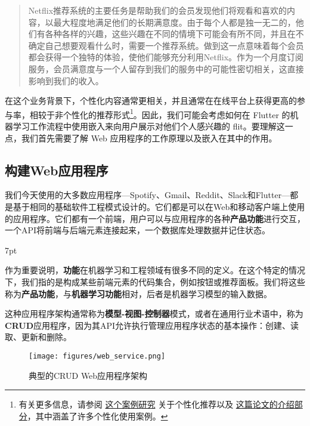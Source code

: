 \documentclass[Chinese, 11pt, table]{diazessay} %
\newenvironment{formal}{%
  \def\FrameCommand{%
	\hspace{1pt}%
	{\color{w_lightblue}\vrule width 2pt}%
	{\color{formalshade}\vrule width 4pt}%
	\colorbox{formalshade}%
  }%
  \MakeFramed{\advance\hsize-\width\FrameRestore}%
  \noindent\hspace{-4.55pt}%
  \begin{adjustwidth}{}{7pt}%
  \vspace{2pt}\vspace{2pt}%
}
{%
  \vspace{2pt}\end{adjustwidth}\endMakeFramed%
}
\begin{document}
\begin{CJK}{UTF8}{gbsn}
\begin{sloppypar}
\begin{quote}
Netflix推荐系统的主要任务是帮助我们的会员发现他们将观看和喜欢的内容，以最大程度地满足他们的长期满意度。由于每个人都是独一无二的，他们有各种各样的兴趣，这些兴趣在不同的情境下可能会有所不同，并且在不确定自己想要观看什么时，需要一个推荐系统。做到这一点意味着每个会员都会获得一个独特的体验，使他们能够充分利用Netflix。作为一个月度订阅服务，会员满意度与一个人留存到我们的服务中的可能性密切相关，这直接影响到我们的收入。
\end{quote}

在这个业务背景下，个性化内容通常更相关，并且通常在在线平台上获得更高的参与率\citep{jannach2010recommender}，相较于非个性化的推荐形式\footnote{有关更多信息，请参阅 \href{http://www.recommenderbook.net/media/Recommender_Systems_An_Introduction_Chapter08_Case_study.pdf}{这个案例研究} 关于个性化推荐以及 \href{https://www.arxiv-vanity.com/papers/1906.03109/}{这篇论文的介绍部分}，其中涵盖了许多个性化使用案例。}。因此，我们可能会考虑如何在 Flutter 的机器学习工作流程中使用嵌入来向用户展示对他们个人感兴趣的 flit。要理解这一点，我们首先需要了解 Web 应用程序的工作原理以及嵌入在其中的作用。

\subsection{构建Web应用程序}

我们今天使用的大多数应用程序---Spotify、Gmail、Reddit、Slack和Flutter---都是基于相同的基础软件工程模式设计的。它们都是可以在Web和移动客户端上使用的应用程序。它们都有一个前端，用户可以与应用程序的各种\textbf{产品功能}进行交互，一个API将前端与后端元素连接起来，一个数据库处理数据并记住状态。

\begin{formal}
作为重要说明，\textbf{功能}在机器学习和工程领域有很多不同的定义。在这个特定的情况下，我们指的是构成某些前端元素的代码集合，例如按钮或推荐面板。我们将这些称为\textbf{产品功能}，与\textbf{机器学习功能}相对，后者是机器学习模型的输入数据。
\end{formal}

这种应用程序架构通常称为\textbf{模型-视图-控制器}模式\citep{fowler2012patterns}，或者在通用行业术语中，称为\textbf{CRUD}应用程序，因为其API允许执行管理应用程序状态的基本操作：创建、读取、更新和删除。

\begin{figure}[H]
\centering
\texttt{[image: figures/web\_service.png]}
\caption{典型的CRUD Web应用程序架构}
\end{figure}


\end{sloppypar}
\end{CJK}
\end{document}
